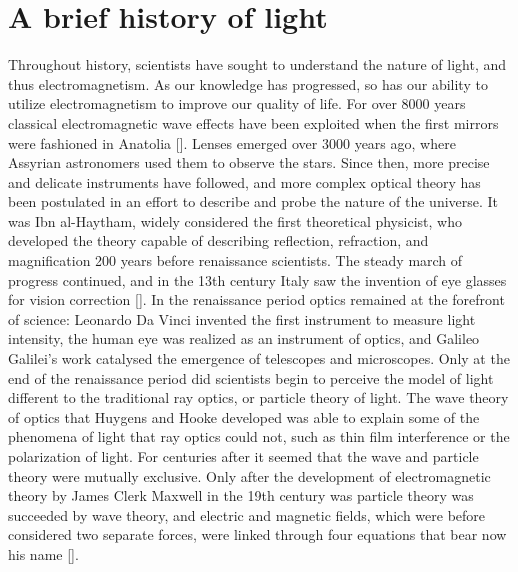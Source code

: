 
\section{A brief history of light}
Throughout history, scientists have sought to understand the nature of light, and thus electromagnetism. As our knowledge has progressed, so has our ability to utilize electromagnetism to improve our quality of life. For over 8000 years classical electromagnetic wave effects have been exploited when the first mirrors were fashioned in Anatolia [\cite{Enoch:06}]. Lenses emerged over 3000 years ago, where Assyrian astronomers used them to observe the stars. Since then, more precise and delicate instruments have followed, and more complex optical theory has been postulated in an effort to describe and probe the nature of the universe. It was Ibn al-Haytham, widely considered the first theoretical physicist, who developed the theory capable of describing reflection, refraction, and magnification 200 years before renaissance scientists. The steady march of progress continued, and in the 13th century Italy saw the invention of eye glasses for vision correction [\cite{ilardi:07}]. In the renaissance period optics remained at the forefront of science: Leonardo Da Vinci invented the first instrument to measure light intensity, the human eye was realized as an instrument of optics, and Galileo Galilei's work catalysed the emergence of telescopes and microscopes. Only at the end of the renaissance period did scientists begin to perceive the model of light different to the traditional ray optics, or particle theory of light. The wave theory of optics that Huygens and Hooke developed was able to explain some of the phenomena of light that ray optics could not, such as thin film interference or the polarization of light. For centuries after it seemed that the wave and particle theory were mutually exclusive. Only after the development of electromagnetic theory by James Clerk Maxwell in the 19th century was particle theory was succeeded by wave theory, and electric and magnetic fields, which were before considered two separate forces, were linked through four equations that bear now his name [\cite{jackson, Landau}]. 

